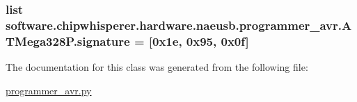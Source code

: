 \subsubsection[{signature}]{\setlength{\rightskip}{0pt plus 5cm}list software.\+chipwhisperer.\+hardware.\+naeusb.\+programmer\+\_\+avr.\+A\+T\+Mega328\+P.\+signature = \mbox{[}0x1e, 0x95, 0x0f\mbox{]}\hspace{0.3cm}{\ttfamily [static]}}\label{classsoftware_1_1chipwhisperer_1_1hardware_1_1naeusb_1_1programmer__avr_1_1ATMega328P_ad2acca9d8a96148c76e3d8997eea70cb}


The documentation for this class was generated from the following file\+:\begin{DoxyCompactItemize}
\item 
\hyperlink{programmer__avr_8py}{programmer\+\_\+avr.\+py}\end{DoxyCompactItemize}
